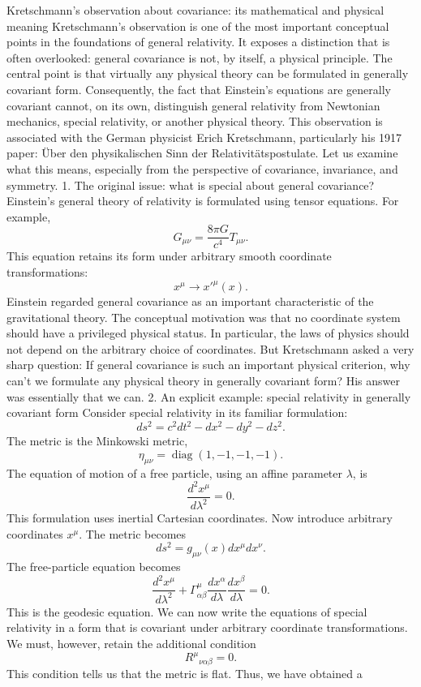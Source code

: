 Kretschmann's observation about covariance: its mathematical and physical
meaning Kretschmann's observation is one of the most important conceptual
points in the foundations of general relativity. It exposes a distinction that
is often overlooked: general covariance is not, by itself, a physical
principle. The central point is that virtually any physical theory can be
formulated in generally covariant form. Consequently, the fact that Einstein's
equations are generally covariant cannot, on its own, distinguish general
relativity from Newtonian mechanics, special relativity, or another physical
theory. This observation is associated with the German physicist Erich
Kretschmann, particularly his 1917 paper: Über den physikalischen Sinn der
Relativitätspostulate. Let us examine what this means, especially from the
perspective of covariance, invariance, and symmetry. 1. The original issue:
what is special about general covariance? Einstein's general theory of
relativity is formulated using tensor equations. For example, \[
    G_{\mu\nu}=\frac{8\pi G}{c^4}T_{\mu\nu}. \] This equation retains its form
under arbitrary smooth coordinate transformations: \[ x^\mu\longrightarrow
x'^\mu(x). \] Einstein regarded general covariance as an important
characteristic of the gravitational theory. The conceptual motivation was that
no coordinate system should have a privileged physical status. In particular,
the laws of physics should not depend on the arbitrary choice of coordinates.
But Kretschmann asked a very sharp question: If general covariance is such an
important physical criterion, why can't we formulate any physical theory in
generally covariant form? His answer was essentially that we can. 2. An
explicit example: special relativity in generally covariant form Consider
special relativity in its familiar formulation: \[ ds^2=c^2dt^2-dx^2-dy^2-dz^2.
\] The metric is the Minkowski metric, \[
    \eta_{\mu\nu}=\operatorname{diag}(1,-1,-1,-1). \] The equation of motion of
a free particle, using an affine parameter \(\lambda\), is \[
    \frac{d^2x^\mu}{d\lambda^2}=0. \] This formulation uses inertial Cartesian
coordinates. Now introduce arbitrary coordinates \(x^\mu\). The metric becomes
\[ ds^2=g_{\mu\nu}(x)dx^\mu dx^\nu. \] The free-particle equation becomes \[
    \boxed{ \frac{d^2x^\mu}{d\lambda^2} +\Gamma^\mu_{\alpha\beta}
    \frac{dx^\alpha}{d\lambda} \frac{dx^\beta}{d\lambda}=0. } \] This is the
geodesic equation. We can now write the equations of special relativity in a
form that is covariant under arbitrary coordinate transformations. We must,
however, retain the additional condition \[ \boxed{R^\mu{}_{\nu\alpha\beta}=0.}
\] This condition tells us that the metric is flat. Thus, we have obtained a
